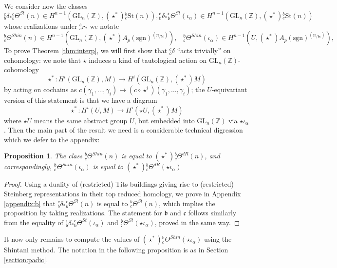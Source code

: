 \documentclass[10pt]{amsart}
\newtheorem{prop}[thm]{Proposition}
\theoremstyle{definition}
\newcommand{\Z}{\mathbb{Z}}
\renewcommand{\c}{\mathfrak{c}}
\renewcommand{\b}{\mathfrak{b}}
\newcommand{\sgn}{\mathrm{sgn}}
\newcommand{\St}{\mathrm{St}}
\newcommand{\GL}{\mathrm{GL}}
\numberwithin{equation}{section}
\begin{document}
    We consider now the classes
    \[
    {}^c_b\delta_*{}^c_b\Theta^{St}(n)\in H^{n-1}(\GL_n(\Z), (\star^*){}^b_c\St(n)),
    {}^\c_\b\delta_*{}^\c_\b\Theta^{St}(\iota_\alpha)\in H^{n-1}(\GL_n(\Z), (\star^*){}^b_c\St(n))
    \] whose realizations under ${}^b_cr_*$ we notate
    \begin{equation} \label{eq:cdreal}
         {}^b_c\Theta^{Shin}(n) \in H^{n-1}(\GL_n(\Z),(\star^*)A_p(\sgn)^{(n_{/bc})}),\;\;\; {}^\b_\c\Theta^{Shin}(\iota_\alpha) \in H^{n-1}(U,(\star^*)A_p(\sgn)^{(n_{/\b\c})}), 
    \end{equation}
    To prove Theorem \ref{thm:interp}, we will first show that ${}^c_b\delta$ ``acts trivially'' on cohomology: we note that $\star$ induces a kind of tautological action on $\GL_n(\Z)$-cohomology
    \[
    \star^*:H^i(\GL_n(\Z),M) \to H^i(\GL_n(\Z),(\star^*)M)
    \]
    by acting on cochains as $c(\gamma_1,\ldots, \gamma_i)\mapsto (c\circ \star^i)(\gamma_1,\ldots, \gamma_i)$; the $U$-equivariant version of this statement is that we have a diagram
    \[
        \star^*:H^i(U,M) \to H^i(\star U,(\star^*)M)
    \]
    where $\star U$ means the same abstract group $U$, but embedded into $\GL_n(\Z)$ via $\star \iota_\alpha$. Then the main part of the result we need is a considerable technical digression which we defer to the appendix:
    
    \begin{prop} \label{prop:titsduality}
        The class ${}^b_c\Theta^{Shin}(n)$ is equal to $(\star^*){}^b_c\Theta^{dR}(n)$, and correspondingly, ${}^\b_\c\Theta^{Shin}(\iota_\alpha)$ is equal to $(\star^*){}^b_c\Theta^{dR}(\star \iota_\alpha)$
    \end{prop}
    \begin{proof}
        Using a duality of (restricted) Tits buildings giving rise to (restricted) Steinberg representations in their top reduced homology, we prove in Appendix \ref{appendix:b} that ${}^c_b\delta_*{}^c_b\Theta^{St}(n)$ is equal to ${}^b_c\Theta^{St}(n)$, which implies the proposition by taking realizations. The statement for $\b$ and $\c$ follows similarly from the equality of ${}^\c_\b\delta_*{}^\c_\b\Theta^{St}(\iota_\alpha)$ and ${}^\b_\c\Theta^{St}(\star \iota_\alpha)$, proved in the same way.
    \end{proof}

    It now only remains to compute the values of $(\star^*){}^\b_\c\Theta^{Shin}(\star \iota_\alpha)$ using the Shintani method. The notation in the following proposition is as in Section \ref{section:padic}. 
\end{document}
